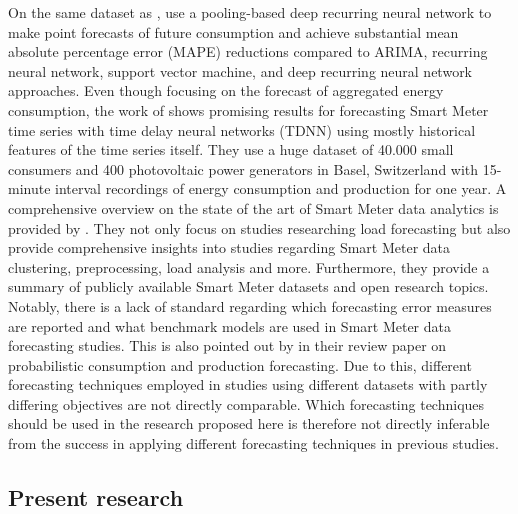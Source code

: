 On the same dataset as \citet{Arora:2016}, \citet{Shi:2017} use a pooling-based deep recurring neural network to make point forecasts of future consumption and achieve substantial mean absolute percentage error (MAPE) reductions compared to ARIMA, recurring neural network, support vector machine, and deep recurring neural network approaches.
Even though focusing on the forecast of aggregated energy consumption, the work of \citet{Zufferey:xxxx} shows promising results for forecasting Smart Meter time series with time delay neural networks (TDNN) using mostly historical features of the time series itself. They use a huge dataset of 40.000 small consumers and 400 photovoltaic power generators in Basel, Switzerland with 15-minute interval recordings of energy consumption and production for one year.
A comprehensive overview on the state of the art of Smart Meter data analytics is provided by \citet{Wang:2018}. They not only focus on studies researching load forecasting but also provide comprehensive insights into studies regarding Smart Meter data clustering, preprocessing, load analysis and more. Furthermore, they provide a summary of publicly available Smart Meter datasets and open research topics.
Notably, there is a lack of standard regarding which forecasting error measures are reported and what benchmark models are used in Smart Meter data forecasting studies. This is also pointed out by \citet{Meer:2018} in their review paper on probabilistic consumption and production forecasting. Due to this, different forecasting techniques employed in studies using different datasets with partly differing objectives are not directly comparable. Which forecasting techniques should be used in the research proposed here is therefore not directly inferable from the success in applying different forecasting techniques in previous studies.



\subsection{Present research}\label{Sec:Intro;Subsec:Present}



